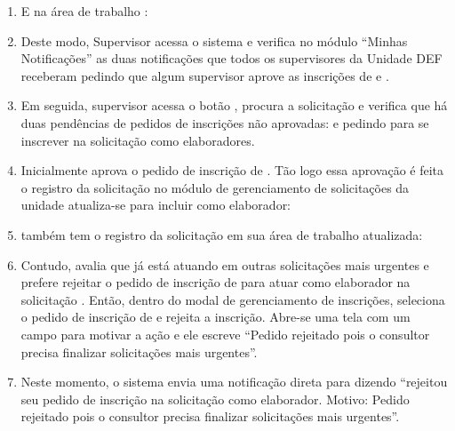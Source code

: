 \begin{landscape}
\begin{enumerate}
	
	\item E na área de trabalho \EQ:


	\item Deste modo, Supervisor \SC acessa o sistema e verifica no módulo ``Minhas Notificações'' as duas notificações que todos os supervisores da Unidade DEF receberam pedindo que algum supervisor aprove as inscrições de \ED e \EQ.
	
	\item Em seguida, supervisor \SC acessa o botão \bGerInscricoes, procura a solicitação \SOLT e  verifica que há duas pendências de pedidos de inscrições não aprovadas: \ED e \EQ pedindo para se inscrever na solicitação como elaboradores. 
	
	\item Inicialmente \SC aprova o pedido de inscrição de \ED. Tão logo essa aprovação é feita o registro da solicitação no módulo de gerenciamento de solicitações da unidade atualiza-se para incluir \ED como elaborador:
	
	
	\item \ED também tem o registro da solicitação em sua área de trabalho atualizada:
	
	
	\item Contudo, \SC avalia que \EQ já está atuando em outras solicitações mais urgentes e prefere rejeitar o pedido de inscrição de \EQ para atuar como elaborador na solicitação \SOLT. Então, dentro do modal de gerenciamento de inscrições, \SC seleciona o pedido de inscrição de \EQ e rejeita a inscrição. Abre-se uma tela com um campo para \SC motivar a ação e ele escreve ``Pedido rejeitado pois o consultor precisa finalizar solicitações mais urgentes''.
	
	\item Neste momento, o sistema envia uma notificação direta para \EQ dizendo ``\SC rejeitou seu pedido de inscrição na solicitação \SOLT como elaborador. Motivo: Pedido rejeitado pois o consultor precisa finalizar solicitações mais urgentes''. 
	

\end{enumerate}
\end{landscape}
